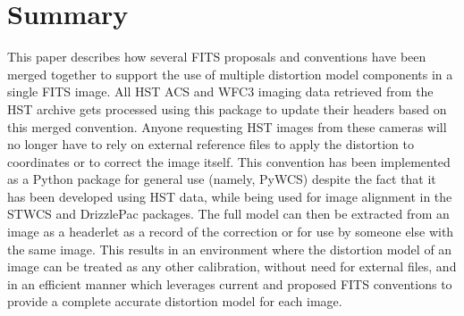 \documentclass[11pt,twoside]{article}
\begin{document}
\section{Summary}
This paper describes how several FITS proposals and conventions have been merged together to support the use of multiple distortion model components in a single FITS image.  All HST ACS and WFC3 imaging data retrieved from the HST archive gets processed using this package to update their headers based on this merged convention. Anyone requesting HST images from these cameras will no longer have to rely on external reference files to apply the distortion to coordinates or to correct the image itself. This convention has been implemented as a Python package for general use (namely, PyWCS) despite the fact that it has been developed using HST data, while being used for image alignment in the STWCS and DrizzlePac packages.  The full model can then be extracted from an image as a headerlet as a record of the correction or for use by someone else with the same image.  This results in an environment where the distortion model of an image can be treated as any other calibration, without need for external files, and in an efficient manner which leverages current and proposed FITS conventions to provide a complete accurate distortion model for each image.


\end{document}
